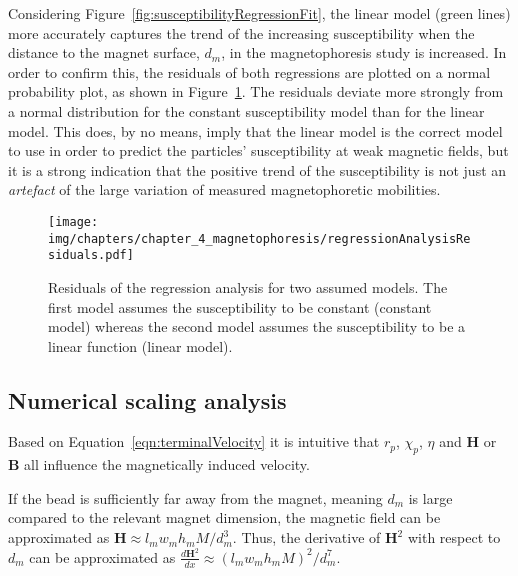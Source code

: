 Considering Figure~\ref{fig:susceptibilityRegressionFit}, the linear model (green lines) more accurately captures the trend of the increasing susceptibility when the distance to the magnet surface, $d_{m}$, in the magnetophoresis study is increased. In order to confirm this, the residuals of both regressions are plotted on a normal probability plot, as shown in Figure~\ref{fig:regressionAnalysisResiduals}. The residuals deviate more strongly from a normal distribution for the constant susceptibility model than for the linear model. This does, by no means, imply that the linear model is the correct model to use in order to predict the particles' susceptibility at weak magnetic fields, but it is a strong indication that the positive trend of the susceptibility is not just an \textit{artefact} of the large variation of measured magnetophoretic mobilities.

\begin{figure}[htb]
   \centering
   \texttt{[image: img/chapters/chapter\_4\_magnetophoresis/regressionAnalysisResiduals.pdf]}
   \caption[Residual plot of regression analysis]{Residuals of the regression analysis for two assumed models. The first model assumes the susceptibility to be constant (constant model) whereas the second model assumes the susceptibility to be a linear function (linear model).}
   \label{fig:regressionAnalysisResiduals}
\end{figure}

\subsection{Numerical scaling analysis}\label{subsec:numericalScalingAnalysis}
Based on Equation~\ref{eqn:terminalVelocity} it is intuitive that $r_{p}$, $\chi_{p}$, $\eta$ and $\mathbf{H}$ or $\mathbf{B}$ all influence the magnetically induced velocity. 

If the bead is sufficiently far away from the magnet, meaning $d_{m}$ is large compared to the relevant magnet dimension, the magnetic field can be approximated as $\mathbf{H} \approx l_{m}w_{m}h_{m}M/d_{m}^{3}$. Thus, the derivative of $\mathbf{H}^{2}$ with respect to $d_{m}$ can be approximated as $\frac{d\mathbf{H}^{2}}{dx} \approx (l_{m}w_{m}h_{m}M)^{2}/d_{m}^{7}$. 
 
